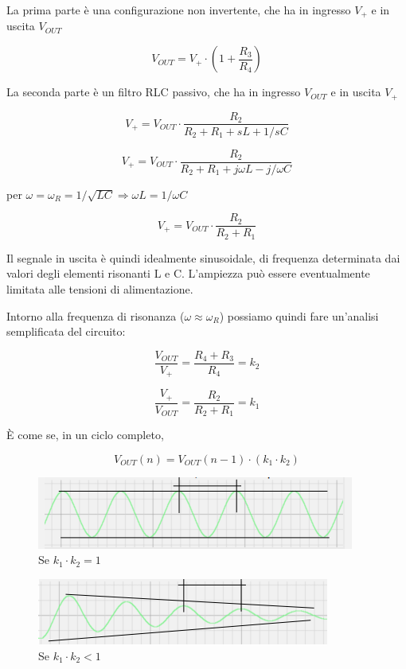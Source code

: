 \documentclass{article}
\begin{document}
La prima parte è una configurazione non invertente, che ha in ingresso $V_+$ e in uscita $V_{OUT}$

\[V_{OUT} = V_+ \cdot \left( 1 + \frac{R_3}{R_4} \right)\]

La seconda parte è un filtro RLC passivo, che ha in ingresso $V_{OUT}$ e in uscita $V_+$

\[V_+ = V_{OUT} \cdot \frac{R_2}{R_2 + R_1 + sL + 1/sC}\]

\[V_+ = V_{OUT} \cdot \frac{R_2}{R_2 + R_1 + j \omega L - j/\omega C}\]

per $\omega = \omega _R = 1/\sqrt{LC} \Rightarrow \omega L = 1/\omega C$

\[V_+ = V_{OUT} \cdot \frac{R_2}{R_2 + R_1}\]

Il segnale in uscita è quindi idealmente sinusoidale, di frequenza determinata dai valori degli elementi risonanti L e C. L'ampiezza può essere eventualmente limitata alle tensioni di alimentazione.

\vspace{1mm}

Intorno alla frequenza di risonanza ($\omega \approx \omega _R$) possiamo quindi fare un'analisi semplificata del circuito:

\[\frac{V_{OUT}}{V_+} = \frac{R_4 + R_3}{R_4} = k_2\]

\[\frac{V_+}{V_{OUT}} = \frac{R_2}{R_2 + R_1} = k_1\]

È come se, in un ciclo completo, 

\[V_{OUT} (n) = V_{OUT} (n-1) \cdot (k_1 \cdot k_2)\]

\begin{figure}[h]
  \centering
  \includegraphics[scale=0.7]{IM_circuito_risonante_serie_attivo_grafico_0}
  \caption{Se $k_1 \cdot k_2 = 1$}
  \label{Schema_circuito_risonante_serie_attivo_grafico_0}
\end{figure}

\begin{figure}[h]
  \centering
  \includegraphics[scale=0.7]{IM_circuito_risonante_serie_attivo_grafico_1}
  \caption{Se $k_1 \cdot k_2 < 1$}
  \label{Schema_circuito_risonante_serie_attivo_grafico_1}
\end{figure}
\end{document}
